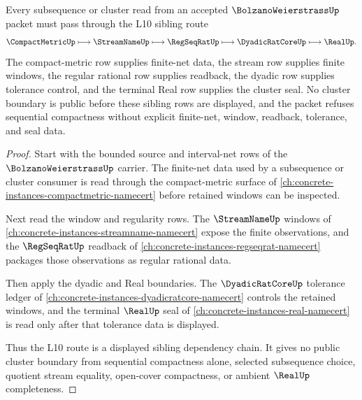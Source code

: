 \begin{theorem}
\label{thm:bolzano-weierstrass-l10-sibling-route}
Every subsequence or cluster read from an accepted $\BolzanoWeierstrassUp$ packet must pass through the L10 sibling route
$$
\CompactMetricUp \longmapsto \StreamNameUp \longmapsto \RegSeqRatUp \longmapsto \DyadicRatCoreUp \longmapsto \RealUp .
$$
The compact-metric row supplies finite-net data, the stream row supplies finite windows, the regular rational row supplies readback, the dyadic row supplies tolerance control, and the terminal Real row supplies the cluster seal. No cluster boundary is public before these sibling rows are displayed, and the packet refuses sequential compactness without explicit finite-net, window, readback, tolerance, and seal data.
\end{theorem}
\begin{proof}
Start with the bounded source and interval-net rows of the $\BolzanoWeierstrassUp$ carrier. The finite-net data used by a subsequence or cluster consumer is read through the compact-metric surface of \autoref{ch:concrete-instances-compactmetric-namecert} before retained windows can be inspected.

Next read the window and regularity rows. The $\StreamNameUp$ windows of \autoref{ch:concrete-instances-streamname-namecert} expose the finite observations, and the $\RegSeqRatUp$ readback of \autoref{ch:concrete-instances-regseqrat-namecert} packages those observations as regular rational data.

Then apply the dyadic and Real boundaries. The $\DyadicRatCoreUp$ tolerance ledger of \autoref{ch:concrete-instances-dyadicratcore-namecert} controls the retained windows, and the terminal $\RealUp$ seal of \autoref{ch:concrete-instances-real-namecert} is read only after that tolerance data is displayed.

Thus the L10 route is a displayed sibling dependency chain. It gives no public cluster boundary from sequential compactness alone, selected subsequence choice, quotient stream equality, open-cover compactness, or ambient $\RealUp$ completeness.
\end{proof}

